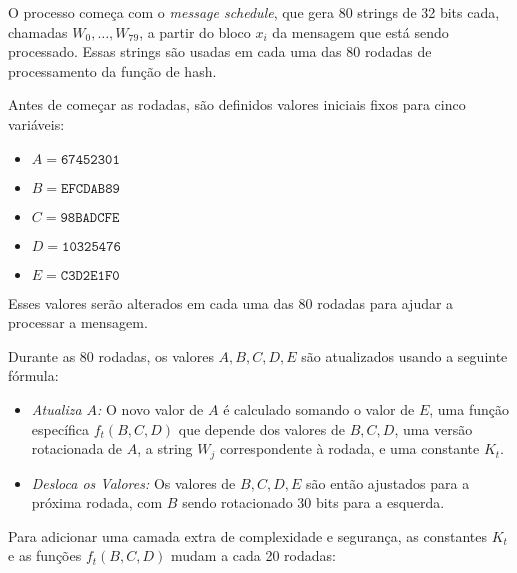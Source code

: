 O processo começa com o \textit{message schedule}, que gera 80 strings de 32 bits cada, chamadas $W_0, \dots, W_{79}$, a partir do bloco $x_i$ da mensagem que está sendo processado.
Essas strings são usadas em cada uma das 80 rodadas de processamento da função de hash.

Antes de começar as rodadas, são definidos valores iniciais fixos para cinco variáveis: 

\begin{itemize}
  \item[] $A = \texttt{67452301}$
  \item[] $B = \texttt{EFCDAB89}$
  \item[] $C = \texttt{98BADCFE}$
  \item[] $D = \texttt{10325476}$
  \item[] $E = \texttt{C3D2E1F0}$
\end{itemize}

Esses valores serão alterados em cada uma das 80 rodadas para ajudar a processar a mensagem.

Durante as 80 rodadas, os valores $A, B, C, D, E$ são atualizados usando a seguinte fórmula:

\begin{itemize}
\item[] {\em Atualiza $A$:}
  O novo valor de $A$ é calculado somando o valor de $E$, uma função específica $f_t(B,C,D)$ que depende dos valores de $B, C, D$, uma versão rotacionada de $A$, a string $W_j$ correspondente à rodada, e uma constante $K_t$.
\item[] {\em Desloca os Valores:}
  Os valores de $B, C, D, E$ são então ajustados para a próxima rodada, com $B$ sendo rotacionado 30 bits para a esquerda.
\end{itemize}

Para adicionar uma camada extra de complexidade e segurança, as constantes $K_t$ e as funções $f_t(B,C,D)$ mudam a cada 20 rodadas:

